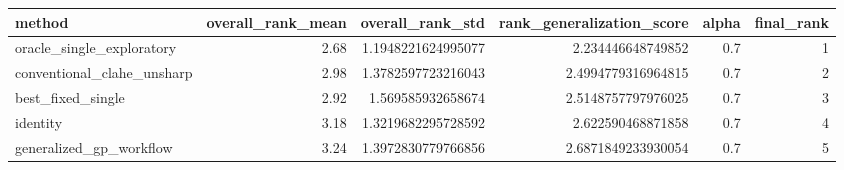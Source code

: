 \begin{tabular}{lrrrrr}
\hline
method & overall\_rank\_mean & overall\_rank\_std & rank\_generalization\_score & alpha & final\_rank \\
\hline
oracle\_single\_exploratory & 2.68 & 1.1948221624995077 & 2.234446648749852 & 0.7 & 1 \\
conventional\_clahe\_unsharp & 2.98 & 1.3782597723216043 & 2.4994779316964815 & 0.7 & 2 \\
best\_fixed\_single & 2.92 & 1.569585932658674 & 2.5148757797976025 & 0.7 & 3 \\
identity & 3.18 & 1.3219682295728592 & 2.622590468871858 & 0.7 & 4 \\
generalized\_gp\_workflow & 3.24 & 1.3972830779766856 & 2.6871849233930054 & 0.7 & 5 \\
\hline
\end{tabular}
